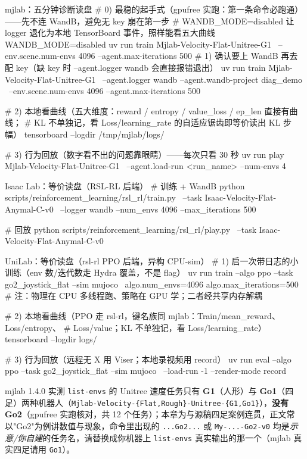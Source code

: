 \begin{codebox}[bash]{mjlab：五分钟诊断读盘}
# 0) 最稳的起手式（gpufree 实跑：第一条命令必跑通）——先不连 WandB，避免无 key 崩在第一步
#    WANDB_MODE=disabled 让 logger 退化为本地 TensorBoard 事件，照样能看五大曲线
WANDB_MODE=disabled uv run train Mjlab-Velocity-Flat-Unitree-G1 \
  --env.scene.num-envs 4096 --agent.max-iterations 500
# 1) 确认要上 WandB 再去配 key（缺 key 时 --agent.logger wandb 会直接报错退出）
uv run train Mjlab-Velocity-Flat-Unitree-G1 \
  --agent.logger wandb --agent.wandb-project diag_demo \
  --env.scene.num-envs 4096 --agent.max-iterations 500

# 2) 本地看曲线（五大维度：reward / entropy / value_loss / ep_len 直接有曲线；
#    KL 不单独记，看 Loss/learning_rate 的自适应锯齿即等价读出 KL 步幅）
tensorboard --logdir /tmp/mjlab/logs/

# 3) 行为回放（数字看不出的问题靠眼睛）——每次只看 30 秒
uv run play Mjlab-Velocity-Flat-Unitree-G1 \
  --agent.load-run <run_name> --num-envs 4
\end{codebox}

\begin{codebox}[bash]{Isaac Lab：等价读盘（RSL-RL 后端）}
# 训练 + WandB
python scripts/reinforcement_learning/rsl_rl/train.py \
  --task Isaac-Velocity-Flat-Anymal-C-v0 \
  --logger wandb --num_envs 4096 --max_iterations 500

# 回放
python scripts/reinforcement_learning/rsl_rl/play.py \
  --task Isaac-Velocity-Flat-Anymal-C-v0
\end{codebox}

\begin{codebox}[bash]{UniLab：等价读盘（rsl-rl PPO 后端，异构 CPU-sim）}
# 1) 启一次带日志的小训练（env 数/迭代数走 Hydra 覆盖，不是 flag）
uv run train --algo ppo --task go2_joystick_flat --sim mujoco \
  algo.num_envs=4096 algo.max_iterations=500
# 注：物理在 CPU 多线程跑、策略在 GPU 学；二者经共享内存解耦

# 2) 本地看曲线（PPO 走 rsl-rl，键名族同 mjlab：Train/mean_reward、Loss/entropy、
#    Loss/value；KL 不单独记，看 Loss/learning_rate）
tensorboard --logdir logs/

# 3) 行为回放（远程无 X 用 Viser；本地录视频用 record）
uv run eval --algo ppo --task go2_joystick_flat --sim mujoco \
  --load-run -1 --render-mode record
\end{codebox}

\begin{note}
mjlab 1.4.0 实测 \verb|list-envs| 的 Unitree 速度任务只有 \textbf{G1}（人形）与 \textbf{Go1}（四足）两种机器人（\verb|Mjlab-Velocity-{Flat,Rough}-Unitree-{G1,Go1}|），\textbf{没有 Go2}（gpufree 实跑核对，共 12 个任务）；本章为与源稿四足案例连贯，正文常以"Go2"为例讲数值与现象，命令里出现的 \verb|...Go2...| 或 \verb|My-...-Go2-v0| 均是\emph{示意/你自建}的任务名，请替换成你机器上 \verb|list-envs| 真实输出的那一个（mjlab 真实四足请用 \verb|Go1|）。
\end{note}

